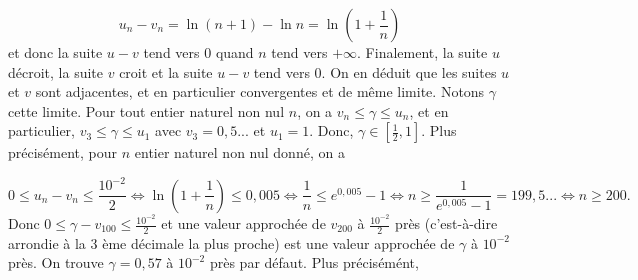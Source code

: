 {\begin{enumerate}
{$$u_n-v_n=\ln(n+1)-\ln n=\ln\left(1+\frac{1}{n}\right)$$ 
et donc la suite $u-v$ tend vers 0 quand $n$ tend vers $+\infty$.
Finalement, la suite $u$ décroit, la suite $v$ croit et la suite $u-v$ tend vers $0$. On en déduit que les suites $u$ et $v$ sont adjacentes, et en particulier convergentes et de même limite. Notons $\gamma$ cette limite.
Pour tout entier naturel non nul $n$, on a $v_n\leq\gamma\leq u_n$, et en particulier, $v_3\leq\gamma\leq u_1$ avec $v_3=0,5...$ et $u_1=1$. Donc, $\gamma\in\left[\frac{1}{2},1\right]$.
Plus précisément, pour $n$ entier naturel non nul donné, on a

$$0\leq u_n-v_n\leq\frac{10^{-2}}{2}\Leftrightarrow\ln\left(1+\frac{1}{n}\right)\leq0,005\Leftrightarrow\frac{1}{n}\leq e^{0,005}-1\Leftrightarrow n\geq\frac{1}{e^{0,005}-1}=199,5...\Leftrightarrow n\geq200.$$
Donc $0\leq\gamma-v_{100}\leq\frac{10^{-2}}{2}$ et une valeur approchée de $v_{200}$ à $\frac{10^{-2}}{2}$ près (c'est-à-dire arrondie à la 3 ème décimale la plus proche) est une valeur approchée de $\gamma$ à $10^{-2}$ près. On trouve $\gamma=0,57$ à $10^{-2}$ près par défaut. Plus précisémént,

\begin{center}
\end{center}}
\end{enumerate}
}
